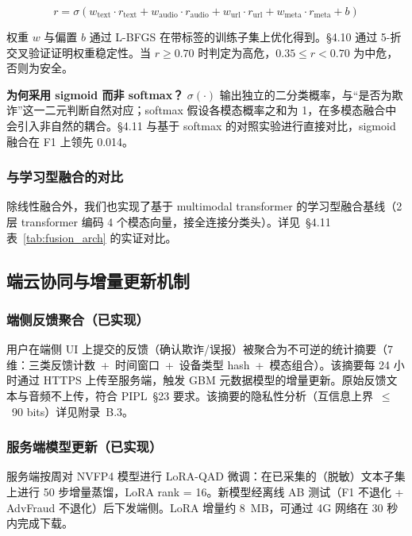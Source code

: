 \documentclass[UTF8,a4paper,10pt,twocolumn]{ctexart}
\theoremstyle{plain}
\begin{document}
\begin{equation}\label{eq:fusion}
r = \sigma(w_{\mathrm{text}} \cdot r_{\mathrm{text}} + w_{\mathrm{audio}} \cdot r_{\mathrm{audio}} + w_{\mathrm{url}} \cdot r_{\mathrm{url}} + w_{\mathrm{meta}} \cdot r_{\mathrm{meta}} + b)
\end{equation}

权重 $w$ 与偏置 $b$ 通过 L-BFGS 在带标签的训练子集上优化得到。\S4.10 通过 5-折交叉验证证明权重稳定性。当 $r \geq 0.70$ 时判定为高危，$0.35 \leq r < 0.70$ 为中危，否则为安全。

\textbf{为何采用 sigmoid 而非 softmax？} $\sigma(\cdot)$ 输出独立的二分类概率，与“是否为欺诈”这一二元判断自然对应；softmax 假设各模态概率之和为 1，在多模态融合中会引入非自然的耦合。\S4.11 与基于 softmax 的对照实验进行直接对比，sigmoid 融合在 F1 上领先 0.014。

\subsubsection{与学习型融合的对比}

除线性融合外，我们也实现了基于 multimodal transformer 的学习型融合基线（2 层 transformer 编码 4 个模态向量，接全连接分类头）。详见~\S4.11 表~\ref{tab:fusion_arch} 的实证对比。

\subsection{端云协同与增量更新机制}

\subsubsection{端侧反馈聚合（已实现）}

用户在端侧 UI 上提交的反馈（确认欺诈/误报）被聚合为不可逆的统计摘要（7 维：三类反馈计数~+~时间窗口~+~设备类型 hash~+~模态组合）。该摘要每 24 小时通过 HTTPS 上传至服务端，触发 GBM 元数据模型的增量更新。原始反馈文本与音频不上传，符合 PIPL~\S23 要求。该摘要的隐私性分析（互信息上界~$\leq$~90 bits）详见附录~B.3。

\subsubsection{服务端模型更新（已实现）}

服务端按周对 NVFP4 模型进行 LoRA-QAD 微调：在已采集的（脱敏）文本子集上进行 50 步增量蒸馏，LoRA rank = 16。新模型经离线 AB 测试（F1 不退化 + AdvFraud 不退化）后下发端侧。LoRA 增量约 8~MB，可通过 4G 网络在 30 秒内完成下载。
\end{document}
